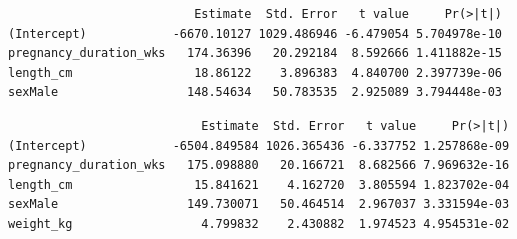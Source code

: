 \documentclass[
  letterpaper,
  DIV=11,
  numbers=noendperiod]{scrreprt}
\newenvironment{Shaded}{\begin{snugshade}}{\end{snugshade}}
\newcommand{\AttributeTok}[1]{\textcolor[rgb]{0.40,0.45,0.13}{#1}}
\newcommand{\CommentTok}[1]{\textcolor[rgb]{0.37,0.37,0.37}{#1}}
\newcommand{\FunctionTok}[1]{\textcolor[rgb]{0.28,0.35,0.67}{#1}}
\newcommand{\NormalTok}[1]{\textcolor[rgb]{0.00,0.23,0.31}{#1}}
\newcommand{\OtherTok}[1]{\textcolor[rgb]{0.00,0.23,0.31}{#1}}
\newcommand{\SpecialCharTok}[1]{\textcolor[rgb]{0.37,0.37,0.37}{#1}}
\begin{document}
\begin{Shaded}
\end{Shaded}

\begin{verbatim}
                          Estimate  Std. Error   t value     Pr(>|t|)
(Intercept)            -6670.10127 1029.486946 -6.479054 5.704978e-10
pregnancy_duration_wks   174.36396   20.292184  8.592666 1.411882e-15
length_cm                 18.86122    3.896383  4.840700 2.397739e-06
sexMale                  148.54634   50.783535  2.925089 3.794448e-03
\end{verbatim}

\begin{Shaded}
\end{Shaded}

\begin{verbatim}
                           Estimate  Std. Error   t value     Pr(>|t|)
(Intercept)            -6504.849584 1026.365436 -6.337752 1.257868e-09
pregnancy_duration_wks   175.098880   20.166721  8.682566 7.969632e-16
length_cm                 15.841621    4.162720  3.805594 1.823702e-04
sexMale                  149.730071   50.464514  2.967037 3.331594e-03
weight_kg                  4.799832    2.430882  1.974523 4.954531e-02
\end{verbatim}
\end{document}
